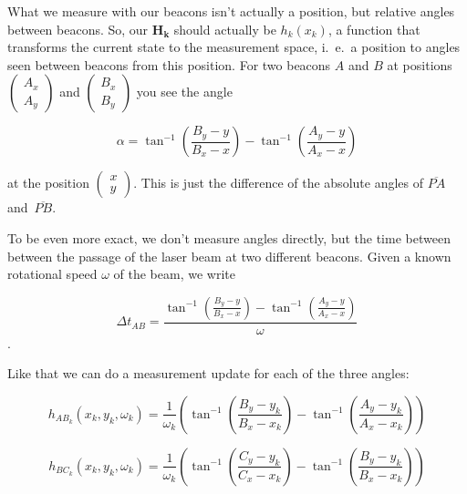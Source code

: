 \documentclass[a4paper, 12pt]{paper}
\begin{document}
What we measure with our beacons isn't actually a position, but relative angles
between beacons. So, our $\mathbf{H_k}$ should actually be $h_k(x_k)$, a
function that transforms the current state to the measurement space, i.\ e.\ a
position to angles seen between beacons from this position.
For two beacons $A$ and $B$ at positions
$\left(\begin{array}{c} A_x \\ A_y \end{array} \right)$ and 
$\left(\begin{array}{c} B_x \\ B_y \end{array} \right)$ you see the angle

\begin{equation}
    \alpha = \tan^{-1}\left(\frac{B_y-y}{B_x-x}\right)
             - \tan^{-1}\left(\frac{A_y-y}{A_x-x}\right)
    \label{eq:pos_to_angle}
\end{equation}

at the position $\left(\begin{array}{c} x \\ y \end{array} \right)$. This is
just the difference of the absolute angles of $\overline{PA}$
and~$\overline{PB}$.

To be even more exact, we don't measure angles directly, but the time between
between the passage of the laser beam at two different beacons. Given a known
rotational speed $\omega$ of the beam, we write

\begin{equation}
    \Delta t_{AB} = \frac{\tan^{-1}\left(\frac{B_y-y}{B_x-x}\right)
        - \tan^{-1}\left(\frac{A_y-y}{A_x-x}\right)}{\omega}
    \label{eq:pos_to_delta_t}
\end{equation}.

Like that we can do a measurement update for each of the three angles:

\begin{equation}
    h_{AB_k}\left(x_k, y_k, \omega_k\right)
        = \frac{1}{\omega_k}\left(\tan^{-1}\left(\frac{B_y-y_k}{B_x-x_k}\right)
        - \tan^{-1}\left(\frac{A_y-y_k}{A_x-x_k}\right)\right)
    \label{eq:h_ab}
\end{equation}

\begin{equation}
    h_{BC_k}\left(x_k, y_k, \omega_k\right)
        = \frac{1}{\omega_k}\left(\tan^{-1}\left(\frac{C_y-y_k}{C_x-x_k}\right)
        - \tan^{-1}\left(\frac{B_y-y_k}{B_x-x_k}\right)\right)
    \label{eq:h_bc}
\end{equation}
\end{document}
